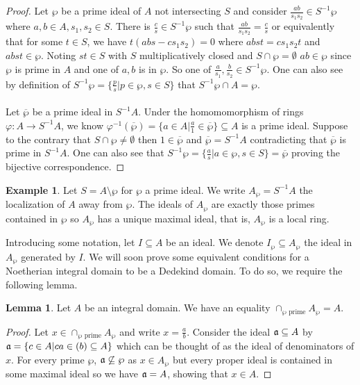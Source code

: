 \documentclass{amsart}
\theoremstyle{definition}
\newtheorem{lemma}[theorem]{Lemma}
\newtheorem{example}[theorem]{Example}
\numberwithin{equation}{section}
\begin{document}
\begin{proof}
  Let $\wp$ be a prime ideal of $A$ not intersecting $S$ and consider $\frac{ab}{s_{1}s_{2}}\in S^{-1}\wp$ where $a,b\in A, s_{1},s_{2}\in S$. There is $\frac{c}{s}\in S^{-1}\wp$ such that $\frac{ab}{s_{1}s_{2}}=\frac{c}{s}$ or equivalently that for some $t\in S$, we have $t(abs-cs_{1}s_{2})=0$ where $abst = cs_{1}s_{2}t$ and $abst\in\wp$. Noting $st\in S$ with $S$ multiplicatively closed and $S\cap\wp=\emptyset$ $ab\in\wp$ since $\wp$ is prime in $A$ and one of $a,b$ is in $\wp$. So one of $\frac{a}{s_{1}},\frac{b}{s_{2}}\in S^{-1}\wp$. One can also see by definition of $S^{-1}\wp=\{\frac{p}{s}|p\in\wp,s\in S\}$ that $S^{-1}\wp\cap A=\wp$. 
  \\\\
  Let $\overline{\wp}$ be a prime ideal in $S^{-1}A$. Under the homomomorphism of rings $\varphi:A\to S^{-1}A$, we know $\varphi^{-1}(\overline{\wp})=\{a\in A|\frac{a}{1}\in\overline{\wp}\}\subseteq A$ is a prime ideal. Suppose to the contrary that $S\cap\wp\neq\emptyset$ then $1\in\overline{\wp}$ and $\overline{\wp}=S^{-1}A$ contradicting that $\overline{\wp}$ is prime in $S^{-1}A$. One can also see that $S^{-1}\wp=\{\frac{a}{s}|a\in\wp,s\in S\}=\overline{\wp}$ proving the bijective correspondence. 
\end{proof}
\begin{example}
  Let $S=A\setminus\wp$ for $\wp$ a prime ideal. We write $A_{\wp}=S^{-1}A$ the localization of $A$ away from $\wp$. The ideals of $A_{\wp}$ are exactly those primes contained in $\wp$ so $A_{\wp}$ has a unique maximal ideal, that is, $A_{\wp}$ is a local ring. 
\end{example}
Introducing some notation, let $I\subseteq A$ be an ideal. We denote $I_{\wp}\subseteq A_{\wp}$ the ideal in $A_{\wp}$ generated by $I$. We will soon prove some equivalent conditions for a Noetherian integral domain to be a Dedekind domain. To do so, we require the following lemma. 
\begin{lemma}\label{lem:intersection of prime ideals}
  Let $A$ be an integral domain. We have an equality $\cap_{\wp\text{ prime}}A_{\wp}=A$. 
\end{lemma}
\begin{proof}
  Let $x\in\cap_{\wp\text{ prime}}A_{\wp}$ and write $x=\frac{a}{b}$. Consider the ideal $\mathfrak{a}\subseteq A$ by $\mathfrak{a}=\{c\in A|ca\in(b)\subseteq A\}$ which can be thought of as the ideal of denominators of $x$. For every prime $\wp$, $\mathfrak{a}\not\subseteq\wp$ as $x\in A_{\wp}$ but every proper ideal is contained in some maximal ideal so we have $\mathfrak{a}=A$, showing that $x\in A$. 
\end{proof}
\end{document}
